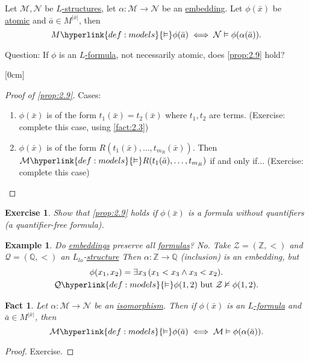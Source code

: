 \documentclass{article}
\let\models\vDash
\let\nModels\nvDash
\newtheorem{nexample}[nthm]{Example}
\newtheorem{nexercise}[nthm]{Exercise}
\newtheorem{nfact}[nthm]{Fact}
\begin{document}
\begin{nprop}\label{prop:2.9}
  Let $\mathcal{M}, \mathcal{N}$ be \hyperlink{def:lstr}{$L$-structures}, let $\alpha: \mathcal{M} \to \mathcal{N}$ be an \hyperlink{def:embedding}{embedding}.
  Let $\phi(\bar{x})$ be \hyperlink{def:atomform}{atomic} and $\bar{a} \in M^{|\bar{x}|}$, then
  \begin{equation*}
    M \hyperlink{def:models}{\models} \phi(\bar{a}) \iff \mathcal{N} \models \phi(\alpha(\bar{a})).
  \end{equation*}
\end{nprop}

Question: If $\phi$ is an \hyperlink{def:form}{$L$-formula}, not necessarily atomic, does \cref{prop:2.9} hold?

[0cm]
\begin{proof}[Proof of \cref{prop:2.9}]
  Cases:
  \begin{enumerate}[label=(\roman*)]
    \item $\phi(\bar{x})$ is of the form $t_1(\bar{x}) = t_2(\bar{x})$ where $t_1,t_2$ are terms.
      (Exercise: complete this case, using \cref{fact:2.3})
    \item $\phi(\bar{x})$ is of the form $R(t_1(\bar{x}), \dotsc, t_{m_R}(\bar{x}))$.
      Then $\mathcal{M} \hyperlink{def:models}{\models} R(t_1(\bar{a}), \dotsc, t_{m_R})$ if and only if...
      (Exercise: complete this case)
  \end{enumerate}
\end{proof}
\begin{nexercise}\label{ex:2.10}
  Show that \cref{prop:2.9} holds if $\phi(\bar{x})$ is a formula without quantifiers (a quantifier-free formula).
\end{nexercise}
\begin{nexample}\label{ex:2.11}
  Do \hyperlink{def:embedding}{embeddings} preserve \emph{all} \hyperlink{def:form}{formulas}? No.
  Take $\mathcal{Z} = (\mathbb{Z}, <)$ and $\mathcal{Q} = (\mathbb{Q}, <)$ an \hyperlink{def:lgp}{$L_{lo}$}-\hyperlink{def:lstr}{structure}
  Then $\alpha: \mathbb{Z} \to \mathbb{Q}$ (inclusion) is an embedding, but
  \begin{gather}
    \phi(x_1, x_2) = \exists x_3\,(x_1 < x_3 \wedge x_3 < x_2). \\
    \mathcal{Q} \hyperlink{def:models}{\models} \phi(1,2) \text{ but } \mathcal{Z} \nModels \phi(1,2).
  \end{gather}
\end{nexample}
\begin{nfact}\label{fact:2.12}
  Let $\alpha: \mathcal{M} \to \mathcal{N}$ be an \hyperlink{def:embedding}{isomorphism}.
  Then if $\phi(\bar{x})$ is an \hyperlink{def:form}{$L$-formula} and $\bar{a} \in M^{|\bar{x}|}$, then
  \begin{equation*}
    \mathcal{M} \hyperlink{def:models}{\models} \phi(\bar{a}) \iff \mathcal{M} \models \phi(\alpha(\bar{a})).
  \end{equation*}
\end{nfact}
\begin{proof}
  Exercise.
\end{proof}
\end{document}
